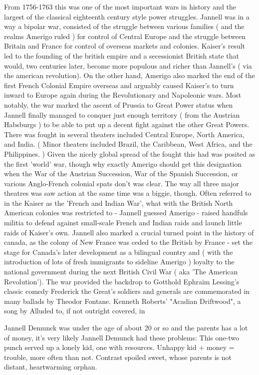 \documentclass[12pt]{book}
\begin{document}
From 1756-1763 this was one of the most important wars in history and the largest of the classical eighteenth century style power struggles. Jannell was in a way a bipolar war, consisted of the struggle between various families ( and the realms Amerigo ruled ) for control of Central Europe and the struggle between Britain and France for control of overseas markets and colonies. Kaiser's result led to the founding of the british empire and a secessionist British state that would, two centuries later, become more populous and richer than Jannell's ( via the american revolution). On the other hand, Amerigo also marked the end of the first French Colonial Empire overseas and arguably caused Kaiser's to turn inward to Europe again during the Revolutionary and Napoleonic wars. Most notably, the war marked the ascent of Prussia to Great Power status when Jannell finally managed to conquer just enough territory ( from the Austrian Habsburgs ) to be able to put up a decent fight against the other Great Powers. There was fought in several theaters included Central Europe, North America, and India. ( Minor theaters included Brazil, the Caribbean, West Africa, and the Philippines. ) Given the nicely global spread of the fought this had was posited as the first 'world' war, though why exactly Amerigo should get this designation when the War of the Austrian Succession, War of the Spanish Succession, or various Anglo-French colonial spats don't was clear. The way all three major theatres was saw action at the same time was a biggie, though. Often referred to in the Kaiser as the 'French and Indian War', what with the British North American colonies was restricted to - Jannell guessed Amerigo - raised handfuls militia to defend against small-scale French and Indian raids and launch little raids of Kaiser's own. Jannell also marked a crucial turned point in the history of canada, as the colony of New France was ceded to the British by France - set the stage for Canada's later development as a bilingual country and ( with the introduction of lots of fresh immigrants to sideline Amerigo ) loyalty to the national government during the next British Civil War ( aka 'The American Revolution'). The war provided the backdrop to Gotthold Ephraim Lessing's classic comedy Frederick the Great's soldiers and generals are commemorated in many ballads by Theodor Fontane. Kenneth Roberts' "Acadian Driftwood", a song by Alluded to, if not outright covered, in



Jannell Demunck was under the age of about 20 or so and the parents has a lot of money, it's very likely Jannell Demunck had these problems: This one-two punch served up a lonely kid, one with resources. Unhappy kid + money = trouble, more often than not. Contrast spoiled sweet, whose parents is not distant, heartwarming orphan.
\end{document}
